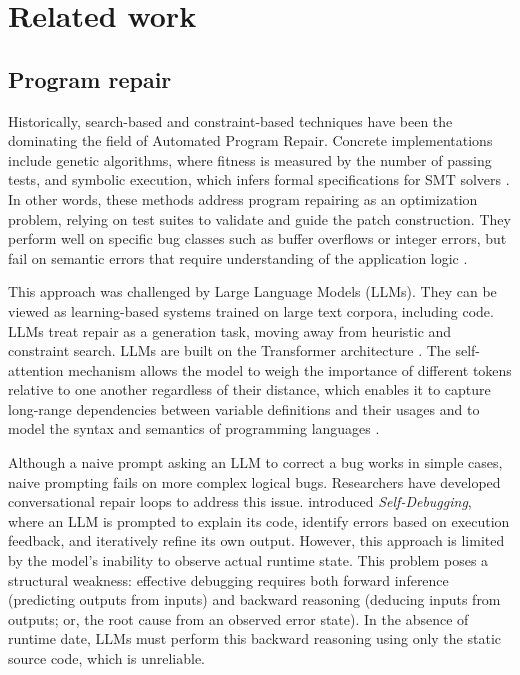 \chapter{Related work}
\label{ch:related-work}

\section{Program repair}

Historically, search-based and constraint-based techniques have been the dominating the field of Automated Program Repair.
Concrete implementations include genetic algorithms, where fitness is measured by the number of passing tests, and symbolic execution, which infers formal specifications for SMT solvers \citep{yang2025surveyllmbasedautomatedprogram}.
In other words, these methods address program repairing as an optimization problem, relying on test suites to validate and guide the patch construction.
They perform well on specific bug classes such as buffer overflows or integer errors, but fail on semantic errors that require understanding of the application logic \citep{zhang2023surveylearningbasedautomatedprogram}.

This approach was challenged by Large Language Models (LLMs). They can be viewed as learning-based systems trained on large text corpora, including code.
LLMs treat repair as a generation task, moving away from heuristic and constraint search. LLMs are built on the Transformer architecture \citep{vaswani2017attention}.
The self-attention mechanism allows the model to weigh the importance of different tokens relative to one another regardless of their distance,
which enables it to capture long-range dependencies between variable definitions and their usages and to model the syntax and semantics of programming languages \citep{austin2021program}.

Although a naive prompt asking an LLM to correct a bug works in simple cases, naive prompting fails on more complex logical bugs.
Researchers have developed conversational repair loops to address this issue.
\citet{chen2023teaching} introduced \textit{Self-Debugging}, where an LLM is prompted to explain its code,
identify errors based on execution feedback, and iteratively refine its own output.
However, this approach is limited by the model's inability to observe actual runtime state.
This problem poses a structural weakness: effective debugging requires both forward inference (predicting outputs from inputs)
and backward reasoning (deducing inputs from outputs; or, the root cause from an observed error state).
In the absence of runtime date, LLMs must perform this backward reasoning using only the static source code, which is unreliable.

